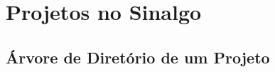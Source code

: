 \documentclass{beamer}
\begin{document}
\section{Projetos no Sinalgo} %
\subsection{Árvore de Diretório de um Projeto} %
\end{document}
